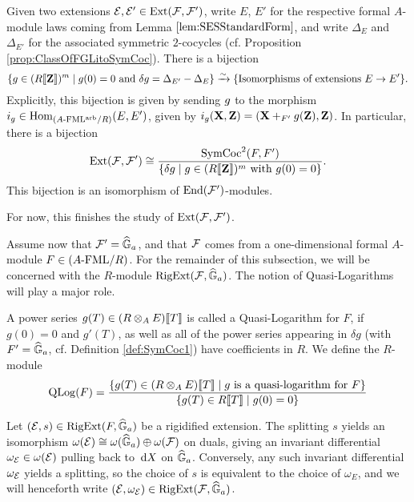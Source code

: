 \documentclass[../main.tex]{subfiles}
\begin{document}
\begin{prop}\label{prop:ExtInTermsOfSymCoc}
  Given two extensions $\mathcal{E},\mathcal{E}' \in \operatorname{Ext}(\mathcal{F}, \mathcal{F}')$, write 
  $E$, $E'$ for the respective formal $A$-module laws coming from Lemma
  $\ref{lem:SESStandardForm}$, and write
  $\Delta_E$ and $\Delta_{E'}$ for the associated symmetric $2$-cocycles (cf.
  Proposition \ref{prop:ClassOfFGLitoSymCoc}). There is a bijection
  \begin{equation*}
    \{{g} \in (R\llbracket \mathbf{Z} \rrbracket)^m \mid {g}(0) = 0 \text{ and } \delta {g} = \Delta_{E'} - \Delta_E\}
    \xrightarrow{\sim} \{\text{Isomorphisms of extensions } E \to E' \}.
  \end{equation*}
  Explicitly, this bijection is given by sending ${g}$ to the morphism
  $i_{g} \in \operatorname{Hom}_{{({A}\text-\allowbreak\mathrm{FML^{arb}}/{R})}}(E, E')$, given by 
  $i_{g} (\mathbf{X}, \mathbf{Z}) = (\mathbf{X} +_{F'} {g}(\mathbf{Z}), \mathbf{Z})$. In particular, there is a bijection
  \begin{equation*}
    \operatorname{Ext}(\mathcal{F}, \mathcal{F}') \cong \frac{\operatorname{SymCoc}^2(F, F')}{\{\delta {g} 
    \mid {g} \in (R\llbracket \mathbf{Z} \rrbracket)^m \text{ with } {g}(0) = 0\}}.
  \end{equation*}
  This bijection is an isomorphism of $\operatorname{End}(\mathcal{F}')$-modules.
\end{prop}
For now, this finishes the study of $\operatorname{Ext}(\mathcal{F}, \mathcal{F}')$. 

Assume now that $\mathcal{F}' = \widehat{\mathbb{G}}_a$, and that 
$\mathcal{F}$ comes from a one-dimensional formal $A$-module $F \in {({A}\text-\allowbreak\mathrm{FML}/{R})}$. For
the remainder of this subsection, we will be concerned with the $R$-module
$\operatorname {RigExt}(\mathcal{F}, \widehat{\mathbb{G}}_a)$. The notion of Quasi-Logarithms will play a major role.

\begin{defi}\label{def:QuasiLogarithm}
  A power series $g(T) \in (R \otimes_A E) \llbracket T \rrbracket$ is called a 
  Quasi-Logarithm for $F$, if $g(0) = 0$ and $g'(T)$, as well as all 
  of the power series appearing in $\delta g$ (with $F' = \widehat{\mathbb{G}}_a$, cf.
  Definition \ref{def:SymCoc1})
  have coefficients in $R$. We define the $R$-module
  \begin{equation*}
    \operatorname {QLog}(F) = \frac{\{g(T) \in (R \otimes_A E) \llbracket T \rrbracket \mid g \text{ is a 
    quasi-logarithm for } F\}}{\{g(T) \in R\llbracket T \rrbracket \mid g(0) = 0\}}
  \end{equation*}
\end{defi}

Let $(\mathcal{E},s) \in \operatorname {RigExt}(F,\widehat{\mathbb{G}}_a)$ be a rigidified extension. 
The splitting $s$ yields an isomorphism $\omega(\mathcal{E}) \cong \omega(\widehat{\mathbb{G}}_a) \oplus
\omega(\mathcal{F})$ on duals, giving an invariant differential $\omega_{\mathcal{E}} \in
\omega(\mathcal{E})$ pulling back to $\, \mathrm{d} X$ on $\widehat{\mathbb{G}}_a$. Conversely, any such invariant
differential $\omega_{\mathcal{E}}$ yields a splitting, so the choice of $s$ is
equivalent to the choice of $\omega_E$, and we will henceforth write 
$(\mathcal{E}, \omega_{\mathcal{E}}) \in \operatorname {RigExt}(\mathcal{F}, \widehat{\mathbb{G}}_a)$. 
\end{document}

